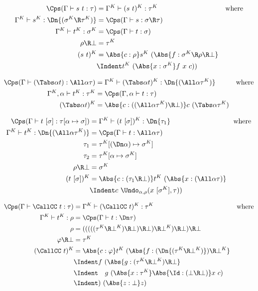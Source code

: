 \documentclass{amsart}
\let\phi=\varphi %
\begin{document}
\begin{align*}
\Cps(\Gamma \vdash s~t : \tau) & =
  \Gamma^K \vdash (s~t)^K : \tau^K
  & \mbox{where}
  \\
\Gamma^K \vdash s^K : \Dn{(\sigma^K \R \tau^K)} & =
  \Cps(\Gamma \vdash s : \sigma \R \tau)
  \\
\Gamma^K \vdash t^K : \sigma^K & =
  \Cps(\Gamma \vdash t : \sigma)
  \\
\rho \R \bot & = \tau^K
  \\
(s~t)^K & =
  \Abs{c : \rho} s^K~(\Abs{f : \sigma^K \R \rho \R \bot} \\
  &\Indent t^K~(\Abs{x : \sigma^K} f~x~c))
\end{align*}

\begin{align*}
\Cps(\Gamma \vdash (\Tabs\alpha t) : \All\alpha \tau) & =
  \Gamma^K \vdash (\Tabs\alpha t)^K : \Dn{(\All\alpha \tau^K)}
  & \mbox{where}
  \\
\Gamma^K,\alpha \vdash t^K : \tau^K & =
  \Cps(\Gamma,\alpha \vdash t : \tau)
  \\
(\Tabs\alpha t)^K & =
  \Abs{c : ((\All\alpha \tau^K) \R \bot)}c~(\Tabs\alpha \tau^K)
\end{align*}

\begin{align*}
\Cps(\Gamma \vdash t~[\sigma] : \tau[\alpha\mapsto\sigma]) & =
  \Gamma^K \vdash (t~[\sigma])^K :
  \Dn{\tau_1}
  & \mbox{where}
  \\
\Gamma^K \vdash t^K : \Dn{(\All\alpha \tau^K)} & =
  \Cps(\Gamma \vdash t : \All\alpha \tau)
  \\
\tau_1 & = \tau^K[(\Dn\alpha) \mapsto \sigma^K]
  \\
\tau_2 & = \tau^K[\alpha \mapsto \sigma^K]
  \\
\rho \R \bot & = \sigma^K
  \\
 (t~[\sigma])^K & =
  \Abs{c : (\tau_1 \R \bot)} t^K~(\Abs{x : (\All\alpha\tau)} \\
  &\Indent
  c~\Undo_{\alpha,\rho}(x~[\sigma^K], \tau))
\end{align*}

\begin{align*}
\Cps(\Gamma \vdash \CallCC~t : \tau) & =
  \Gamma^K \vdash (\CallCC~t)^K : \tau^K
  &\mbox{where}
  \\
\Gamma^K \vdash t^K : \rho & =
  \Cps(\Gamma \vdash t : \Dn\tau)
  \\
\rho & =
  (((((\tau^K \R \bot^K) \R\bot)\R\bot)
    \R \bot^K) \R\bot)\R\bot
  \\
\phi \R \bot & = \tau^K
  \\
(\CallCC~t)^K & =
  \Abs{c : \phi}
  t^K~(\Abs{f : (\Dn{(\tau^K\R\bot^K)}) \R \bot^K}
  \\ &\Indent
  f~(
  \Abs{g : (\tau^K \R \bot^K) \R \bot}
  \\ &\Indent\hspace{1em}
  g~(\Abs{x:\tau^K} \Abs{\Id : (\bot \R \bot)} x~c)
  \\ &\Indent
  )~(\Abs{z:\bot} z)
\end{align*}
\end{document}
